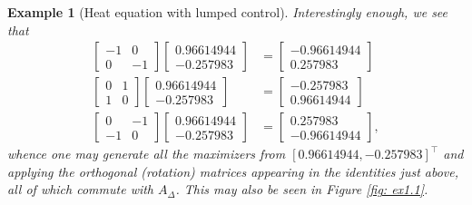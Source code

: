 \documentclass[11pt, a4paper, reqno]{amsart}
\theoremstyle{plain}
\numberwithin{equation}{section}
\newtheorem{example}{Example}[section]
\begin{document}
\begin{example}[Heat equation with lumped control]
	Interestingly enough, we see that
	\begin{align*}
	\begin{bmatrix}-1&0\\0&-1\end{bmatrix}\begin{bmatrix} 0.96614944\\-0.257983\end{bmatrix} &= \begin{bmatrix} -0.96614944\\0.257983\end{bmatrix}\\
	\begin{bmatrix}0&1\\1&0\end{bmatrix}\begin{bmatrix} 0.96614944\\-0.257983\end{bmatrix} &= \begin{bmatrix} -0.257983\\0.96614944\end{bmatrix}\\
	\begin{bmatrix}0&-1\\-1&0\end{bmatrix}\begin{bmatrix} 0.96614944\\-0.257983\end{bmatrix} &= \begin{bmatrix} 0.257983\\-0.96614944\end{bmatrix},
	\end{align*}
	whence one may generate all the maximizers from $[0.96614944, -0.257983]^\top$ and applying the orthogonal (rotation) matrices appearing in the identities just above, all of which commute with $A_\Delta$. This may also be seen in Figure \ref{fig: ex1.1}.
		

\end{example}
\end{document}
